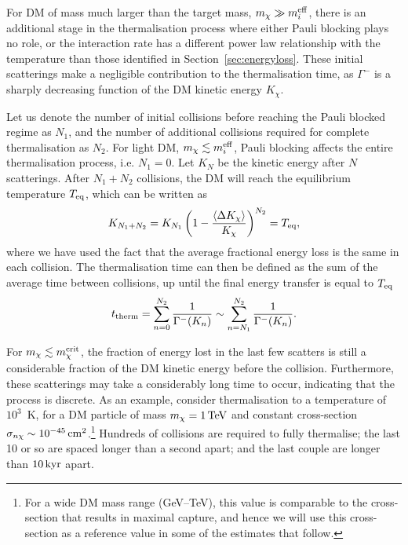 For DM of mass much larger than the target mass, $m_\chi\gg m_i^{\rm eff}$, there is an additional stage in the thermalisation process where either Pauli blocking plays no role, or the interaction rate has a different power law relationship with the temperature than those identified in Section~\ref{sec:energyloss}. These initial scatterings make a negligible contribution to the thermalisation time, as  $\Gamma^{-}$ is a sharply decreasing function of the DM kinetic energy $K_\chi$. 

 
Let us denote the number of initial collisions before reaching the Pauli blocked regime as $N_1$, and the number of additional collisions required for complete thermalisation as $N_2$. For light DM, $m_\chi\lesssim m_i^{\rm eff}$, Pauli blocking affects the entire thermalisation process, i.e. $N_1=0$. Let $K_N$ be the kinetic energy after $N$ scatterings. After $N_1+N_2$ collisions, the DM will reach the equilibrium temperature $T_{\rm eq}$, which can be written as
\begin{equation}
K_{N_1+N_2} = 
K_{N_1}\left(1-\frac{\langle \Delta K_\chi \rangle}{K_\chi}\right)^{N_2} = T_{\rm eq},  
\label{ch6:eq:Teq}
\end{equation}
where we have used the fact that the average fractional energy loss is the same in each collision. 
The thermalisation time can then be defined as the sum of the average time between collisions, up until the final energy transfer is equal to $T_{\rm eq}$~\cite{Bertoni:2013bsa_dec_DarkMatterThermalization}
\begin{equation}
t_{\rm therm} = \sum_{n=0}^{N_2} \frac{1}{\Gamma^{-}(K_n)} \sim \sum_{n=N_1}^{N_2} \frac{1}{\Gamma^{-}(K_n)}.  
\label{ch6:eq:thermtime}
\end{equation}


For  $m_\chi \lesssim m_\chi^{\rm crit}$, the fraction of energy lost in the last few scatters is still a considerable fraction of the DM kinetic energy before the collision. Furthermore, these scatterings may take a considerably long time to occur, indicating that the process is discrete. 
As an example, consider thermalisation to a temperature of $10^3$~K, for a DM particle of mass $m_\chi=1{\rm \,TeV}$ and constant cross-section $\sigma_{n\chi} \sim 10^{-45}{\rm \,cm}^2$.\footnote{ For a wide DM mass range (GeV--TeV), this value is comparable to the cross-section that results in maximal capture, and hence we will use this cross-section as a reference value in some of the estimates that follow.} Hundreds of collisions are required to fully thermalise; the last 10 or so are spaced longer than a second apart; and the last couple are longer than $10 {\rm \,kyr}$ apart.    

